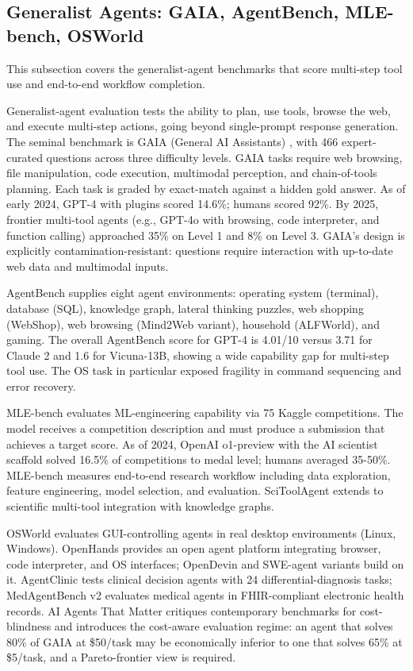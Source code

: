 \documentclass{article}
\begin{document}
\subsection{Generalist Agents: GAIA, AgentBench, MLE-bench, OSWorld}\label{generalist-agents-gaia-agentbench-mle-bench-osworld}

This subsection covers the generalist-agent benchmarks that score multi-step tool use and end-to-end workflow completion.

Generalist-agent evaluation tests the ability to plan, use tools, browse the web, and execute multi-step actions, going beyond single-prompt response generation. The seminal benchmark is GAIA (General AI Assistants) \cite{mialon2024gaiaabenchmarkforg}, with 466 expert-curated questions across three difficulty levels. GAIA tasks require web browsing, file manipulation, code execution, multimodal perception, and chain-of-tools planning. Each task is graded by exact-match against a hidden gold answer. As of early 2024, GPT-4 with plugins scored 14.6\%; humans scored 92\%. By 2025, frontier multi-tool agents (e.g., GPT-4o with browsing, code interpreter, and function calling) approached 35\% on Level 1 and 8\% on Level 3. GAIA's design is explicitly contamination-resistant: questions require interaction with up-to-date web data and multimodal inputs.

AgentBench \cite{liu2023gevalnlgevaluation} supplies eight agent environments: operating system (terminal), database (SQL), knowledge graph, lateral thinking puzzles, web shopping (WebShop), web browsing (Mind2Web variant), household (ALFWorld), and gaming. The overall AgentBench score for GPT-4 is 4.01/10 versus 3.71 for Claude 2 and 1.6 for Vicuna-13B, showing a wide capability gap for multi-step tool use. The OS task in particular exposed fragility in command sequencing and error recovery.

MLE-bench \cite{chan20242024} evaluates ML-engineering capability via 75 Kaggle competitions. The model receives a competition description and must produce a submission that achieves a target score. As of 2024, OpenAI o1-preview with the AI scientist scaffold solved 16.5\% of competitions to medal level; humans averaged 35-50\%. MLE-bench measures end-to-end research workflow including data exploration, feature engineering, model selection, and evaluation. SciToolAgent \cite{ding20252025} extends to scientific multi-tool integration with knowledge graphs.

OSWorld evaluates GUI-controlling agents in real desktop environments (Linux, Windows). OpenHands \cite{wang20242024} provides an open agent platform integrating browser, code interpreter, and OS interfaces; OpenDevin and SWE-agent variants build on it. AgentClinic \cite{schmidgall20262026} tests clinical decision agents with 24 differential-diagnosis tasks; MedAgentBench v2 \cite{chen20262026} evaluates medical agents in FHIR-compliant electronic health records. AI Agents That Matter \cite{kapoor20242024} critiques contemporary benchmarks for cost-blindness and introduces the cost-aware evaluation regime: an agent that solves 80\% of GAIA at \$50/task may be economically inferior to one that solves 65\% at \$5/task, and a Pareto-frontier view is required.
\end{document}

